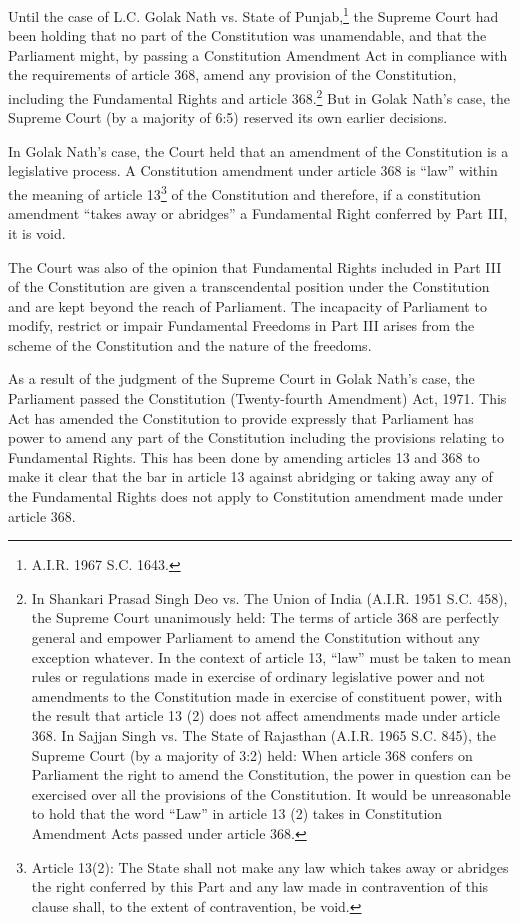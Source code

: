 \begin{multicols}{2}

\noi
Until the case of L.C. Golak Nath vs. State of Punjab,\footnote{A.I.R. 1967 S.C. 1643.} the Supreme Court had been holding
that no part of the Constitution was unamendable, and that the Parliament might, by passing a
Constitution Amendment Act in compliance with the requirements of article 368, amend any
provision of the Constitution, including the Fundamental Rights and article 368.\footnote{In Shankari Prasad Singh Deo vs. The Union of India (A.I.R. 1951 S.C. 458), the Supreme Court unanimously held: The terms of article 368 are perfectly general and empower Parliament to amend the Constitution without any exception whatever. In the context of article 13, “law” must be taken to mean rules or regulations made in exercise of ordinary legislative power and not amendments to the Constitution made in exercise of constituent power, with the result that article 13 (2) does not affect amendments made under article 368. In Sajjan Singh vs.
The State of Rajasthan (A.I.R. 1965 S.C. 845), the Supreme Court (by a majority of 3:2) held: When article 368
confers on Parliament the right to amend the Constitution, the power in question can be exercised over all the
provisions of the Constitution. It would be unreasonable to hold that the word “Law” in article 13 (2) takes in
Constitution Amendment Acts passed under article 368.} But in
Golak Nath’s case, the Supreme Court (by a majority of 6:5) reserved its own earlier decisions.

\noi
In Golak Nath’s case, the Court held that an amendment of the Constitution is a legislative
process. A Constitution amendment under article 368 is “law” within the meaning of article
13\footnote{Article 13(2): The State shall not make any law which takes away or abridges the right conferred by this Part
and any law made in contravention of this clause shall, to the extent of contravention, be void.} of the Constitution and therefore, if a constitution amendment “takes away or abridges”
a Fundamental Right conferred by Part III, it is void.

\noi
The Court was also of the opinion that Fundamental Rights included in Part III of the
Constitution are given a transcendental position under the Constitution and are kept beyond
the reach of Parliament. The incapacity of Parliament to modify, restrict or impair
Fundamental Freedoms in Part III arises from the scheme of the Constitution and the nature
of the freedoms.

\noi
As a result of the judgment of the Supreme Court in Golak Nath’s case, the Parliament passed
the Constitution (Twenty-fourth Amendment) Act, 1971. This Act has amended the
Constitution to provide expressly that Parliament has power to amend any part of the
Constitution including the provisions relating to Fundamental Rights. This has been done by
amending articles 13 and 368 to make it clear that the bar in article 13 against abridging or
taking away any of the Fundamental Rights does not apply to Constitution amendment made
under article 368.


\end{multicols}
